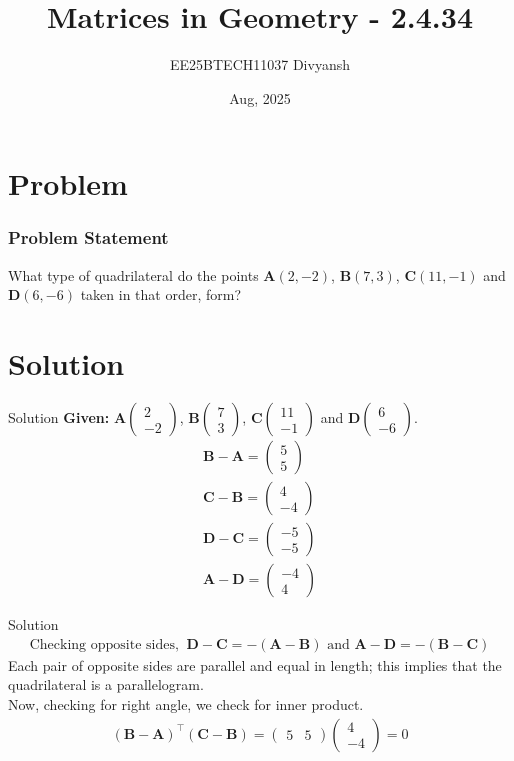 \documentclass{beamer}
\title{Matrices in Geometry - 2.4.34}
\author{EE25BTECH11037  Divyansh}
\date{Aug, 2025}
\let\vec\mathbf
\providecommand{\brak}[1]{\ensuremath{\left(#1\right)}}
\theoremstyle{remark}
\newcommand{\myvec}[1]{\ensuremath{\begin{pmatrix}#1\end{pmatrix}}}
\begin{document}
\maketitle


\section{Problem}
\begin{frame}
\frametitle{Problem Statement}
What type of quadrilateral do the points $\vec{A}\brak{2,-2}$, $\vec{B}\brak{7,3}$, $\vec{C}\brak{11,-1}$ and $\vec{D}\brak{6,-6}$ taken in that order, form?
\end{frame}

\section{Solution}
\begin{frame}{Solution}
   \textbf{Given: } 
 $\vec{A}\myvec{2\\-2}$, $\vec{B}\myvec{7\\3}$, $\vec{C}\myvec{11 \\ -1}$ and $\vec{D}\myvec{6 \\ -6}$.
\begin{align}
    \vec{B}- \vec{A}=\myvec{5 \\ 5} \\ \vec{C}- \vec{B}=\myvec{4 \\ -4} \\ \vec{D}- \vec{C}=\myvec{-5 \\ -5}\\  \vec{A}- \vec{D}=\myvec{-4 \\ 4}
\end{align}
\end{frame}

\begin{frame}{Solution}
\begin{align}
    \text{Checking opposite sides, } \ \vec{D}-\vec{C}=-\brak{\vec{A}-\vec{B}} \text{ and } \vec{A}-\vec{D}=-\brak{\vec{B}-\vec{C}}
\end{align}
Each pair of opposite sides are parallel and equal in length; this implies that the quadrilateral is a parallelogram.\\
Now, checking for right angle, we check for inner product.
\begin{align}
 \brak{\vec{B}- \vec{A}}^{\top} \brak{\vec{C}- \vec{B}}=\myvec{5 & 5}\myvec{4 \\ -4}=0
\end{align}
\end{frame}
\end{document}
